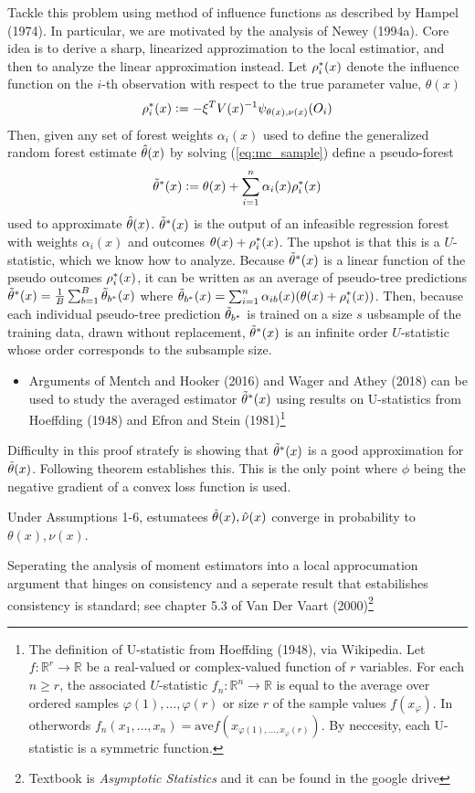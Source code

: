 Tackle this problem using method of influence functions as described by Hampel (1974). In particular, we are motivated by the analysis of Newey (1994a). Core idea is to derive a sharp, linearized approzimation to the local estimatior, and then to analyze the linear approximation instead. Let $\rho_{i}^*(x)$ denote the influence function on the $i$-th observation with respect to the true parameter value, $\theta(x)$
\[\rho_{i}^*(x) := -\xi^TV(x)^{-1}\psi_{\theta(x),\nu(x)}(O_i)\]
Then, given any set of forest weights $\alpha_i(x)$ used to define the generalized random forest estimate $\hat{\theta}(x)$ by solving (\ref{eq:mc_sample}) define a pseudo-forest 
\begin{equation}
\label{eq:thetaHat_appx}
	\tilde{\theta}^*(x) := \theta(x) + \sum_{i=1}^n \alpha_i(x) \rho_{i}^*(x)
\end{equation}
used to approximate $\hat{\theta}(x)$. $\tilde{\theta}^*(x)$ is the output of an infeasible regression forest with weights $\alpha_i(x)$ and outcomes $\theta(x) + \rho_{i}^*(x)$. The upshot is that this is a $U$-statistic, which we know how to analyze. Because $\tilde{\theta}^*(x)$ is a linear function of the pseudo outcomes $\rho_{i}^*(x)$, it can be written as an average of pseudo-tree predictions $\tilde{\theta}^*(x) = \frac{1}{B}\sum_{b=1}^B \tilde{\theta}_{b^*}(x)$ where $\tilde{\theta}_{b^*}(x) = \sum_{i=1}^n \alpha_{ib}(x)(\theta(x)+ \rho_{i}^*(x))$. Then, because each individual pseudo-tree prediction $\tilde{\theta}_{b^*}$ is trained on a size $s$ usbsample of the training data, drawn without replacement, $\tilde{\theta}^*(x)$ is an infinite order $U$-statistic whose order corresponds to the subsample size. 
\begin{itemize}
	\item Arguments of Mentch and Hooker (2016) and Wager and Athey (2018) can be used to study the averaged estimator $\tilde{\theta}^*(x)$ using results on U-statistics from Hoeffding (1948) and Efron and Stein (1981)\footnote{The definition of U-statistic from Hoeffding (1948), via Wikipedia. Let $f: \mathbb{R}^r \rightarrow \mathbb{R}$ be a real-valued or complex-valued function of $r$ variables. For each $n\geq r$, the associated $U$-statistic $f_n:\mathbb{R}^n \rightarrow \mathbb{R}$ is equal to the average over ordered samples $\varphi(1), \dots, \varphi(r)$ or size $r$ of the sample values $f(x_\varphi)$. In otherwords $f_n(x_1, \dots, x_n) = \text{ave} f(x_{\varphi(1), \dots, x_\varphi(r)})$. By neccesity, each U-statistic is a symmetric function.} 
\end{itemize}
Difficulty in this proof stratefy is showing that $\tilde{\theta}^*(x)$ is a good approximation for $\tilde{\theta}(x)$. Following theorem establishes this. This is the only point where $\phi$ being the negative gradient of a convex loss function is used. 
\begin{theorem}
	\label{thm:consistency}
	Under Assumptions 1-6, estumatees $\hat{\theta}(x), \hat{\nu}(x)$ converge in probability to $\theta(x), \nu(x)$.
\end{theorem}
Seperating the analysis of moment estimators into a local approcumation argument that hinges on consistency and a seperate result that estabilishes consistency is standard; see chapter 5.3 of Van Der Vaart (2000)\footnote{Textbook is \textit{Asymptotic Statistics} and it can be found in the google drive}

